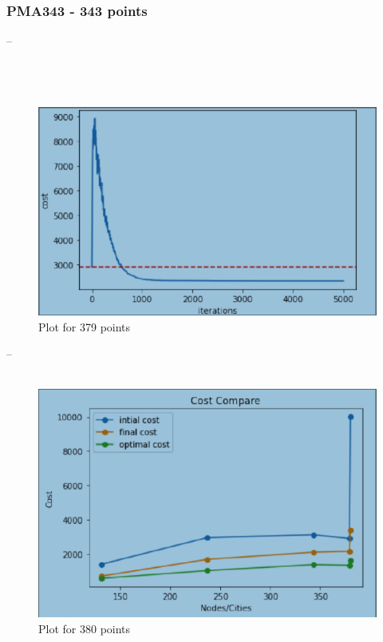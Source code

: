 \documentclass[conference]{IEEEtran}
\begin{document}
\subsubsection{PMA343 - 343 points}

--
\\
\\

\\
\\
\begin{figure}[htbp]
\centerline{\includegraphics[scale=0.8]{abc.png}}
\caption{Plot for 379 points}
\label{fig}
\end{figure}
--
\\
\\
\begin{figure}[htbp]
\centerline{\includegraphics[scale=0.8]{bcc.png}}
\caption{Plot for 380 points}
\label{fig}
\end{figure}
\end{document}
